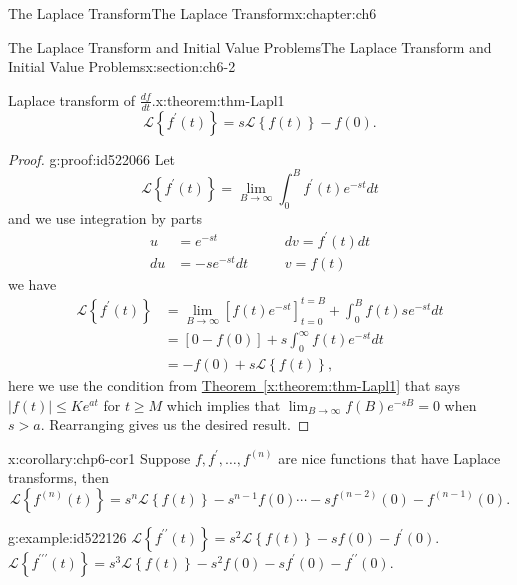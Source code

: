 \documentclass[oneside,10pt,]{book}
\newcommand{\xreffont}{\relax}
\numberwithin{equation}{section}
\numberwithin{equation}{section}
\newcommand{\amp}{&}
\begin{document}
\begin{chapterptx}{The Laplace Transform}{}{The Laplace Transform}{}{}{x:chapter:ch6}
\begin{sectionptx}{The Laplace Transform and Initial Value Problems}{}{The Laplace Transform and Initial Value Problems}{}{}{x:section:ch6-2}
\begin{introduction}{}
\begin{theorem}{Laplace transform of \(\frac{df}{dt}\).}{}{x:theorem:thm-Lapl1}
\begin{equation*}
\mathcal{L}\left\{ f^{\prime}(t)\right\} =s\mathcal{L}\left\{ f(t)\right\} -f(0).
\end{equation*}
%
\end{theorem}
\begin{proof}{}{g:proof:id522066}
Let%
\begin{equation*}
\mathcal{L}\left\{ f^{\prime}(t)\right\} =\lim_{B\to\infty}\int_{0}^{B}f^{\prime}(t)e^{-st}dt
\end{equation*}
and we use integration by parts%
\begin{align*}
u \amp=e^{-st} \amp \,\,\,\,\,\,\,\,\,\,\,dv=f^{\prime}(t)dt\\
du \amp =-se^{-st}dt \amp \,\,\,\,\,\,\,\,\,\,\,v=f(t)
\end{align*}
we have%
\begin{align*}
\mathcal{L}\left\{ f^{\prime}(t)\right\}  \amp =\lim_{B\to\infty}\left[f(t)e^{-st}\right]_{t=0}^{t=B}+\int_{0}^{B}f(t)se^{-st}dt\\
\amp =\left[0-f(0)\right]+s\int_{0}^{\infty}f(t)e^{-st}dt\\
\amp =-f(0)+s\mathcal{L}\left\{ f(t)\right\} ,
\end{align*}
here we use the condition from \hyperref[x:theorem:thm-Lapl1]{Theorem~{\xreffont\ref{x:theorem:thm-Lapl1}}} that says \(\left|f(t)\right|\leq Ke^{at}\) for \(t\geq M\) which implies that \(\lim_{B\to\infty}f(B)e^{-sB}=0\) when \(s>a\).  Rearranging gives us the desired result.%
\end{proof}
\begin{corollary}{}{}{x:corollary:chp6-cor1}%
Suppose \(f,f^{\prime},\dots,f^{(n)}\) are nice functions that have Laplace transforms, then%
\begin{equation*}
\mathcal{L}\left\{ f^{(n)}(t)\right\} =s^{n}\mathcal{L}\left\{ f(t)\right\} -s^{n-1}f(0)\cdots-sf^{(n-2)}(0)-f^{(n-1)}(0).
\end{equation*}
%
\end{corollary}
\begin{example}{}{g:example:id522126}%
\(\mathcal{L}\left\{ f^{\prime\prime}(t)\right\} =s^{2}\mathcal{L}\left\{ f(t)\right\} -sf(0)-f^{\prime}(0)\). \(\mathcal{L}\left\{ f^{\prime\prime\prime}(t)\right\} =s^{3}\mathcal{L}\left\{ f(t)\right\} -s^{2}f(0)-sf^{\prime}(0)-f^{\prime\prime}(0)\).\end{example}
\end{introduction}%
%
%
\typeout{************************************************}

\end{sectionptx}
\end{chapterptx}
\end{document}
